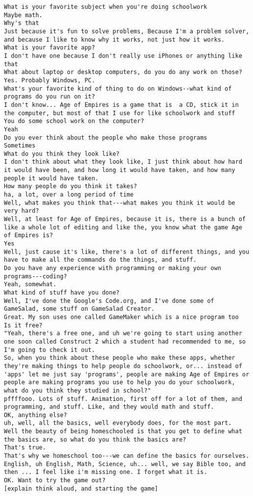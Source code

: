 \begin{lstlisting}
What is your favorite subject when you're doing schoolwork
Maybe math.
Why's that
Just because it's fun to solve problems, Because I'm a problem solver, and because I like to know why it works, not just how it works.
What is your favorite app?
I don't have one because I don't really use iPhones or anything like that
What about laptop or desktop computers, do you do any work on those?
Yes. Probably Windows, PC.
What's your favorite kind of thing to do on Windows--what kind of programs do you run on it?
I don't know... Age of Empires is a game that is  a CD, stick it in the computer, but most of that I use for like schoolwork and stuff
You do some school work on the computer?
Yeah
Do you ever think about the people who make those programs
Sometimes
What do you think they look like?
I don't think about what they look like, I just think about how hard it would have been, and how long it would have taken, and how many people it would have taken.
How many people do you think it takes?
ha, a lot, over a long period of time
Well, what makes you think that---what makes you think it would be very hard?
Well, at least for Age of Empires, because it is, there is a bunch of like a whole lot of editing and like the, you know what the game Age of Empires is?
Yes
Well, just cause it's like, there's a lot of different things, and you have to make all the commands do the things, and stuff.
Do you have any experience with programming or making your own programs---coding?
Yeah, somewhat.
What kind of stuff have you done?
Well, I've done the Google's Code.org, and I've done some of GameSalad, some stuff on GameSalad Creator.
Great. My son uses one called GameMaker which is a nice program too
Is it free?
"Yeah, there's a free one, and uh we're going to start using another one soon called Construct 2 which a student had recommended to me, so I'm going to check it out.
So, when you think about these people who make these apps, whether they're making things to help people do schoolwork, or... instead of 'apps' let me just say 'programs', people are making Age of Empires or people are making programs you use to help you do your schoolwork, what do you think they studied in school?"
pffffooo. Lots of stuff. Animation, first off for a lot of them, and programming, and stuff. Like, and they would math and stuff.
OK, anything else?
uh, well, all the basics, well everybody does, for the most part.
Well the beauty of being homeschooled is that you get to define what the basics are, so what do you think the basics are?
That's true.
That's why we homeschool too---we can define the basics for ourselves.
English, uh English, Math, Science, uh... well, we say Bible too, and then ... I feel like i'm missing one. I forget what it is.
OK. Want to try the game out?
[explain think aloud, and starting the game]


\end{lstlisting}
